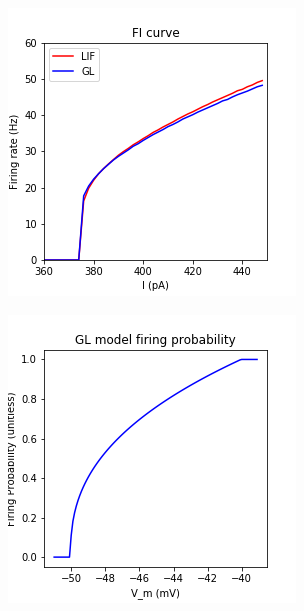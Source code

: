 \documentclass[11pt]{scrartcl}
\begin{document}
\begin{multicols}{2}
  \begin{center}
    \includegraphics[width=\linewidth]{figures/FI_curve}
    \captionsetup{width=\linewidth}
    \label{fig:FI_curve}
  \end{center}
  \begin{center}
    \includegraphics[width=\linewidth]{figures/GL_Phi}
    \captionsetup{width=\linewidth}
    \label{fig:GL_Phi}
  \end{center}
\end{multicols}
\end{document}
